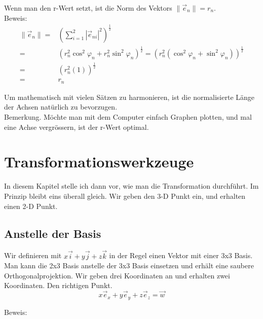 \documentclass[a4paper]{article}
\begin{document}
Wenn man den r-Wert setzt, ist die Norm des Vektors $\|\vec{e}_n\| = r_n$.\\

Beweis:\\
\begin{displaymath}
\begin{align}
    \|\vec{e}_n\| =& (\sum_{i=1}^{2}|\vec{e}_{ni}|^2)^{\frac12} \\
    =& (r_{n}^{2}\cos^{2}\varphi_n + r_{n}^{2}\sin^{2}\varphi_n)^{\frac12} = (r_{n}^2(\cos^{2}\varphi_n + \sin^{2}\varphi_n))^{\frac12}\\
    =& (r_{n}^2(1))^{\frac12} \\
    =& r_n
\end{align}
\end{displaymath}

Um mathematisch mit vielen S\"atzen zu harmonieren, ist die normalisierte L\"ange der Achsen nat\"urlich zu bevorzugen.\\

Bemerkung. M\"ochte man mit dem Computer einfach Graphen plotten, und mal eine Achse vergr\"ossern, ist der r-Wert optimal.\\


\section{Transformationswerkzeuge}

In diesem Kapitel stelle ich dann vor, wie man die Transformation durchf\"uhrt. Im Prinzip bleibt eins \"uberall gleich. Wir geben den 3-D Punkt ein, und erhalten einen 2-D Punkt.\\

\subsection{Anstelle der Basis}

Wir definieren mit $x\vec{i}+y\vec{j}+z\vec{k}$ in der Regel einen Vektor mit einer 3x3 Basis. Man kann die 2x3 Basis anstelle der 3x3 Basis einsetzen und erh\"alt eine saubere Orthogonalprojektion. Wir geben drei Koordinaten an und erhalten zwei Koordinaten. Den richtigen Punkt.\\

\begin{displaymath}
x\vec{e}_{x} + y\vec{e}_{y} + z\vec{e}_{z} = \vec{w} 
\end{displaymath}

Beweis:\\
\end{document}
